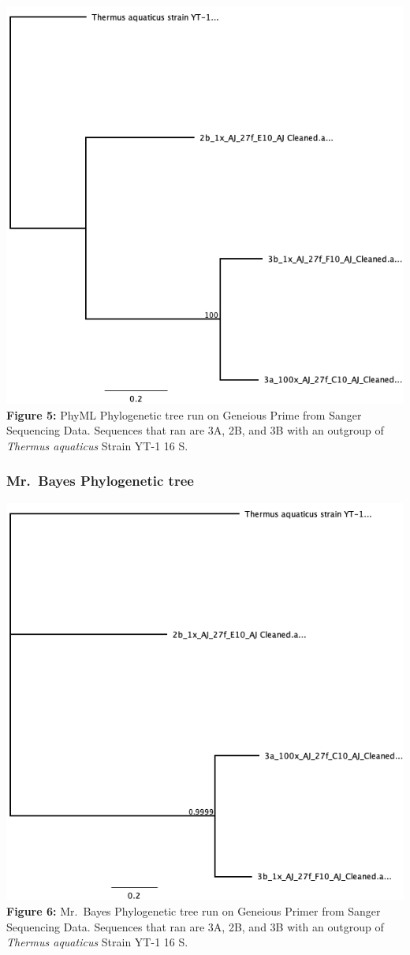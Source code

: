 \documentclass[]{article}
\begin{document}
\includegraphics{output/phylogenies/Sanger_Sequence_PHYML_Phylogeny.png}
\textbf{Figure 5:} PhyML Phylogenetic tree run on Geneious Prime from
Sanger Sequencing Data. Sequences that ran are 3A, 2B, and 3B with an
outgroup of \emph{Thermus aquaticus} Strain YT-1 16 S.

\hypertarget{mr.bayes-phylogenetic-tree}{%
\subsubsection{Mr.~Bayes Phylogenetic
tree}\label{mr.bayes-phylogenetic-tree}}

\includegraphics{output/phylogenies/Sanger_Sequence_MrBayes_Phylogeny.png}
\textbf{Figure 6:} Mr.~Bayes Phylogenetic tree run on Geneious Primer
from Sanger Sequencing Data. Sequences that ran are 3A, 2B, and 3B with
an outgroup of \emph{Thermus aquaticus} Strain YT-1 16 S.
\end{document}
